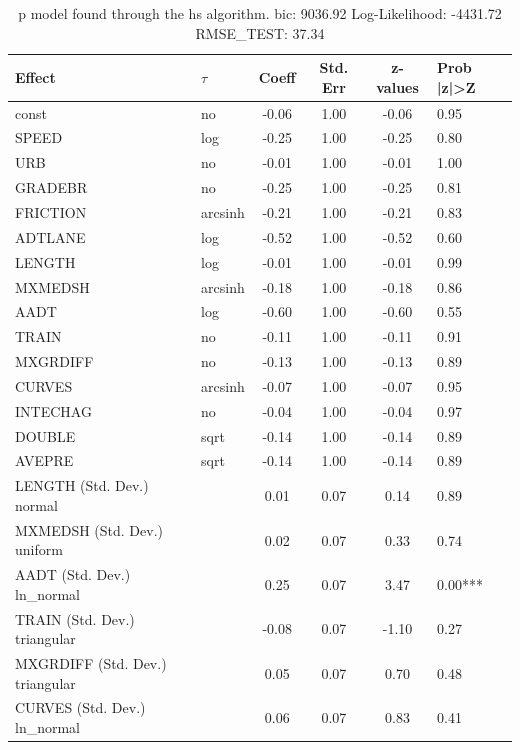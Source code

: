\begin{table}
	\caption{p model found through the hs algorithm. bic: 9036.92 Log-Likelihood: -4431.72 RMSE_TEST: 37.34}
	\begin{center}
		\begin{tabular}{|l|l|c|c|c|l|}
			\hline
			Effect & $\tau$ & Coeff & Std. Err & z-values & Prob |z|>Z \\
			\hline
			const & no & -0.06 & 1.00 & -0.06 & 0.95 \\
			\hline
			SPEED & log & -0.25 & 1.00 & -0.25 & 0.80 \\
			\hline
			URB & no & -0.01 & 1.00 & -0.01 & 1.00 \\
			\hline
			GRADEBR & no & -0.25 & 1.00 & -0.25 & 0.81 \\
			\hline
			FRICTION & arcsinh & -0.21 & 1.00 & -0.21 & 0.83 \\
			\hline
			ADTLANE & log & -0.52 & 1.00 & -0.52 & 0.60 \\
			\hline
			LENGTH & log & -0.01 & 1.00 & -0.01 & 0.99 \\
			\hline
			MXMEDSH & arcsinh & -0.18 & 1.00 & -0.18 & 0.86 \\
			\hline
			AADT & log & -0.60 & 1.00 & -0.60 & 0.55 \\
			\hline
			TRAIN & no & -0.11 & 1.00 & -0.11 & 0.91 \\
			\hline
			MXGRDIFF & no & -0.13 & 1.00 & -0.13 & 0.89 \\
			\hline
			CURVES & arcsinh & -0.07 & 1.00 & -0.07 & 0.95 \\
			\hline
			INTECHAG & no & -0.04 & 1.00 & -0.04 & 0.97 \\
			\hline
			DOUBLE & sqrt & -0.14 & 1.00 & -0.14 & 0.89 \\
			\hline
			AVEPRE & sqrt & -0.14 & 1.00 & -0.14 & 0.89 \\
			\hline
			LENGTH (Std. Dev.) normal &  & 0.01 & 0.07 & 0.14 & 0.89 \\
			\hline
			MXMEDSH (Std. Dev.) uniform &  & 0.02 & 0.07 & 0.33 & 0.74 \\
			\hline
			AADT (Std. Dev.) ln_normal &  & 0.25 & 0.07 & 3.47 & 0.00*** \\
			\hline
			TRAIN (Std. Dev.) triangular &  & -0.08 & 0.07 & -1.10 & 0.27 \\
			\hline
			MXGRDIFF (Std. Dev.) triangular &  & 0.05 & 0.07 & 0.70 & 0.48 \\
			\hline
			CURVES (Std. Dev.) ln_normal &  & 0.06 & 0.07 & 0.83 & 0.41 \\
			\hline

\end{tabular}
\end{center}
\end{table}
